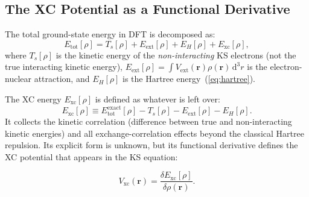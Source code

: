 \documentclass[12pt,letterpaper]{article}
\newcommand{\dd}{\mathrm{d}}
\newcommand{\Vxc}{V_{\mathrm{xc}}}
\newcommand{\Exc}{E_{\mathrm{xc}}}
\theoremstyle{definition}
\begin{document}
\subsection{The XC Potential as a Functional Derivative}

The total ground-state energy in DFT is decomposed as:
\begin{equation}
  E_{\mathrm{tot}}[\rho]
  = T_s[\rho] + E_{\mathrm{ext}}[\rho] + E_H[\rho] + \Exc[\rho],
  \label{eq:etot_decomp}
\end{equation}
where $T_s[\rho]$ is the kinetic energy of the \emph{non-interacting}
KS electrons (not the true interacting kinetic energy),
$E_{\mathrm{ext}}[\rho] = \int V_{\mathrm{ext}}(\bm{r})\rho(\bm{r})\,\dd^3r$
is the electron-nuclear attraction, and $E_H[\rho]$ is the Hartree
energy~(\ref{eq:hartree}).

The XC energy $\Exc[\rho]$ is defined as whatever is left over:
\begin{equation}
  \Exc[\rho]
  \equiv E_{\mathrm{tot}}^{\mathrm{exact}}[\rho]
       - T_s[\rho] - E_{\mathrm{ext}}[\rho] - E_H[\rho].
  \label{eq:exc_def}
\end{equation}
It collects the kinetic correlation (difference between true and
non-interacting kinetic energies) and all exchange-correlation effects
beyond the classical Hartree repulsion.
Its explicit form is unknown, but its functional derivative defines the XC
potential that appears in the KS equation:

\begin{equation}
  \boxed{\Vxc(\bm{r}) = \frac{\delta\Exc[\rho]}{\delta\rho(\bm{r})}.}
  \label{eq:vxc_fd}
\end{equation}
\end{document}
